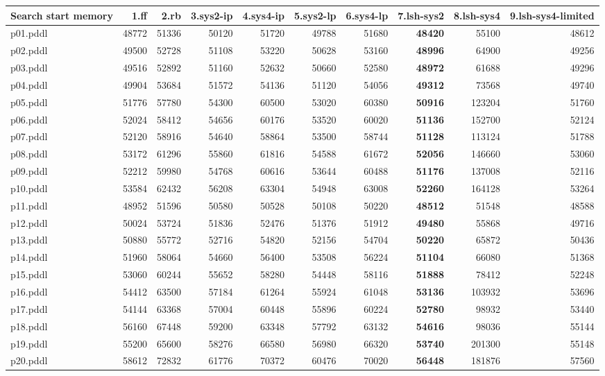 \documentclass{article}
\begin{document}
\begin{tabular}{@{}lrrrrrrrrr@{}}
Search start memory & 1.ff & 2.rb & 3.sys2-ip & 4.sys4-ip & 5.sys2-lp & 6.sys4-lp & 7.lsh-sys2 & 8.lsh-sys4 & 9.lsh-sys4-limited \\
\midrule
p01.pddl & 48772 & 51336 & 50120 & 51720 & 49788 & 51680 & \textbf{48420} & 55100 & 48612 \\
p02.pddl & 49500 & 52728 & 51108 & 53220 & 50628 & 53160 & \textbf{48996} & 64900 & 49256 \\
p03.pddl & 49516 & 52892 & 51160 & 52632 & 50660 & 52580 & \textbf{48972} & 61688 & 49296 \\
p04.pddl & 49904 & 53684 & 51572 & 54136 & 51120 & 54056 & \textbf{49312} & 73568 & 49740 \\
p05.pddl & 51776 & 57780 & 54300 & 60500 & 53020 & 60380 & \textbf{50916} & 123204 & 51760 \\
p06.pddl & 52024 & 58412 & 54656 & 60176 & 53520 & 60020 & \textbf{51136} & 152700 & 52124 \\
p07.pddl & 52120 & 58916 & 54640 & 58864 & 53500 & 58744 & \textbf{51128} & 113124 & 51788 \\
p08.pddl & 53172 & 61296 & 55860 & 61816 & 54588 & 61672 & \textbf{52056} & 146660 & 53060 \\
p09.pddl & 52212 & 59980 & 54768 & 60616 & 53644 & 60488 & \textbf{51176} & 137008 & 52116 \\
p10.pddl & 53584 & 62432 & 56208 & 63304 & 54948 & 63008 & \textbf{52260} & 164128 & 53264 \\
p11.pddl & 48952 & 51596 & 50580 & 50528 & 50108 & 50220 & \textbf{48512} & 51548 & 48588 \\
p12.pddl & 50024 & 53724 & 51836 & 52476 & 51376 & 51912 & \textbf{49480} & 55868 & 49716 \\
p13.pddl & 50880 & 55772 & 52716 & 54820 & 52156 & 54704 & \textbf{50220} & 65872 & 50436 \\
p14.pddl & 51960 & 58064 & 54660 & 56400 & 53508 & 56224 & \textbf{51104} & 66080 & 51368 \\
p15.pddl & 53060 & 60244 & 55652 & 58280 & 54448 & 58116 & \textbf{51888} & 78412 & 52248 \\
p16.pddl & 54412 & 63500 & 57184 & 61264 & 55924 & 61048 & \textbf{53136} & 103932 & 53696 \\
p17.pddl & 54144 & 63368 & 57004 & 60448 & 55896 & 60224 & \textbf{52780} & 98932 & 53440 \\
p18.pddl & 56160 & 67448 & 59200 & 63348 & 57792 & 63132 & \textbf{54616} & 98036 & 55144 \\
p19.pddl & 55200 & 65600 & 58276 & 66580 & 56980 & 66320 & \textbf{53740} & 201300 & 55148 \\
p20.pddl & 58612 & 72832 & 61776 & 70372 & 60476 & 70020 & \textbf{56448} & 181876 & 57560 \\
\end{tabular}
\end{document}
